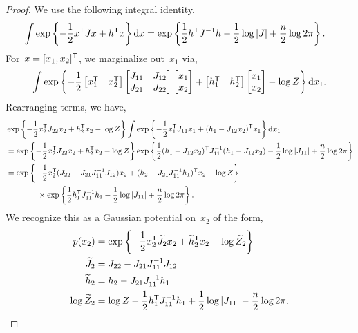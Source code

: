 \documentclass{article}
\begin{document}
\begin{proof}
  We use the following integral identity,
\begin{align}
  \int \exp \left \{ - \frac{1}{2} x^{\mathsf{T}} J x + h^{\mathsf{T}} x\right\} \mathrm{d} x
  &= \exp \left\{ \frac{1}{2} h^{\mathsf{T}} J^{-1} h - \frac{1}{2} \log |J| + \frac{n}{2} \log 2 \pi \right\}.
\end{align}
For~$x = [x_1, x_2]^{\mathsf{T}}$, we marginalize out~$x_1$ via,
\begin{align}
  \int \exp \left \{ - \frac{1}{2}
  \begin{bmatrix} x_1^{\mathsf{T}} & x_2^{\mathsf{T}} \end{bmatrix} 
  \begin{bmatrix} J_{11} & J_{12} \\ J_{21} & J_{22} \end{bmatrix}
  \begin{bmatrix} x_1 \\  x_2 \end{bmatrix}
  + \begin{bmatrix} h_1^{\mathsf{T}} & h_2^{\mathsf{T}} \end{bmatrix} 
  \begin{bmatrix} x_1 \\  x_2 \end{bmatrix}
  - \log Z
  \right \}
  \mathrm{d} x_1.
\end{align}
Rearranging terms, we have,
\begin{align}
  &\exp \left \{ -\frac{1}{2} x_2^{\mathsf{T}} J_{22} x_2 + h_2^{\mathsf{T}} x_2 - \log Z \right \}
  \int \exp \left \{- \frac{1}{2} x_1^{\mathsf{T}} J_{11} x_1 + (h_1 - J_{12}x_2)^{\mathsf{T}} x_1 \right \} \mathrm{d}x_1 \\
  &= \exp \left \{ -\frac{1}{2} x_2^{\mathsf{T}} J_{22} x_2 + h_2^{\mathsf{T}} x_2 - \log Z \right \}
  \exp \left \{ \frac{1}{2} (h_1 - J_{12}x_2)^{\mathsf{T}} J_{11}^{-1} (h_1 - J_{12} x_2) - \frac{1}{2} \log |J_{11}| + \frac{n}{2} \log 2 \pi \right \} \\
  &= \exp \left \{ -\frac{1}{2} x_2^{\mathsf{T}} (J_{22} - J_{21}J_{11}^{-1} J_{12}) x_2
  + (h_2 - J_{21} J_{11}^{-1} h_1)^{\mathsf{T}} x_2 - \log Z \right \} \nonumber \\
  &\qquad \qquad \times
  \exp \left \{ \frac{1}{2} h_1^{\mathsf{T}} J_{11}^{-1} h_1 - \frac{1}{2} \log |J_{11}| + \frac{n}{2} \log 2 \pi \right \}.
\end{align}
We recognize this as a Gaussian potential on~$x_2$ of the form,
\begin{align}
  p(x_2) &= \exp \left \{-\frac{1}{2} x_2^{\mathsf{T}} \widetilde{J}_2 x_2 + \widetilde{h}_2^{\mathsf{T}} x_2 - \log \widetilde{Z}_2 \right \} \\
  \widetilde{J}_2 &= J_{22} - J_{21}J_{11}^{-1} J_{12} \\
  \widetilde{h}_2 &= h_2 - J_{21} J_{11}^{-1} h_1 \\
  \log \widetilde{Z}_2 &= \log Z -\frac{1}{2} h_1^{\mathsf{T}} J_{11}^{-1} h_1 + \frac{1}{2} \log |J_{11}| - \frac{n}{2} \log 2 \pi.
\end{align}
\end{proof}
\end{document}
